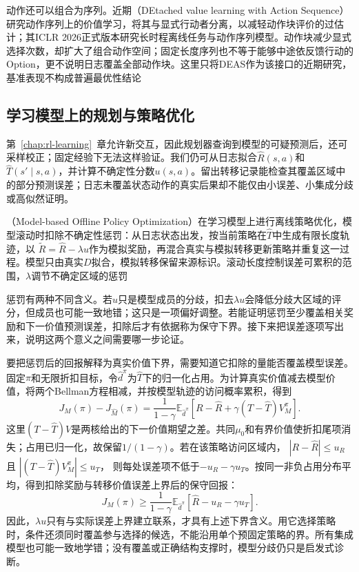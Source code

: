 动作还可以组合为序列。近期（DEtached value learning with Action Sequence）研究动作序列上的价值学习，将其与显式行动者分离，以减轻动作块评价的过估计；其ICLR 2026正式版本研究长时程离线任务与动作序列模型。动作块减少显式选择次数，却扩大了组合动作空间；固定长度序列也不等于能够中途依反馈行动的Option，更不说明日志覆盖全部动作块。这里只将DEAS作为该接口的近期研究，基准表现不构成普遍最优性结论

\subsection{学习模型上的规划与策略优化}
\label{sec:rl-information-model-learning}

第~\ref{chap:rl-learning}~章允许新交互，因此规划器查询到模型的可疑预测后，还可采样校正；固定经验下无法这样验证。我们仍可从日志拟合$\widehat R(s,a)$和$\widehat T(s'\mid s,a)$，并计算不确定性分数$u(s,a)$。留出转移记录能检查其覆盖区域中的部分预测误差；日志未覆盖状态动作的真实后果却不能仅由小误差、小集成分歧或高似然证明。

（Model-based Offline Policy Optimization）在学习模型上进行离线策略优化，模型滚动时扣除不确定性惩罚：从日志状态出发，按当前策略在$\widehat T$中生成有限长度轨迹，以
$\widetilde R=\widehat R-\lambda u$作为模拟奖励，再混合真实与模拟转移更新策略并重复这一过程。模型只由真实$D$拟合，模拟转移保留来源标识。滚动长度控制误差可累积的范围，$\lambda$调节不确定区域的惩罚

惩罚有两种不同含义。若$u$只是模型成员的分歧，扣去$\lambda u$会降低分歧大区域的评分，但成员也可能一致地错；这只是一项偏好调整。若能证明惩罚至少覆盖相关奖励和下一价值预测误差，扣除后才有依据称为保守下界。接下来把误差逐项写出来，说明这两个意义之间需要哪一步论证。

要把惩罚后的回报解释为真实价值下界，需要知道它扣除的量能否覆盖模型误差。固定$\pi$和无限折扣目标，令$\widehat d^\pi$为$\widehat T$下的归一化占用。为计算真实价值减去模型价值，将两个Bellman方程相减，并按模型轨迹的访问概率累积，得到
\begin{equation}
  \label{eq:rl-information-model-telescoping}
  J_M(\pi)-J_{\widehat M}(\pi)
  =\frac1{1-\gamma}\mathbb E_{\widehat d^\pi}
       \left[R-\widehat R
                  +\gamma(T-\widehat T)V_M^\pi\right].
\end{equation}
这里$(T-\widehat T)V$是两核给出的下一价值期望之差。共同$\mu_0$和有界价值使折扣尾项消失；占用已归一化，故保留$1/(1-\gamma)$。若在该策略访问区域内，
$|R-\widehat R|\leq u_R$且
$|(T-\widehat T)V_M^\pi|\leq u_T$，
则每处误差项不低于$-u_R-\gamma u_T$。按同一非负占用分布平均，得到扣除奖励与转移价值误差上界后的保守回报：
\[
  J_M(\pi)\geq
    \frac1{1-\gamma}\mathbb E_{\widehat d^\pi}
       [\widehat R-u_R-\gamma u_T].
\]
因此，$\lambda u$只有与实际误差上界建立联系，才具有上述下界含义。用它选择策略时，条件还须同时覆盖参与选择的候选，不能沿用单个预固定策略的界。所有集成模型也可能一致地学错；没有覆盖或正确结构支撑时，模型分歧仍只是启发式诊断。

